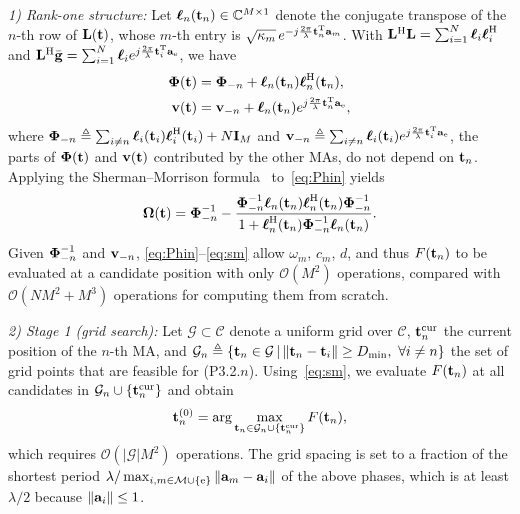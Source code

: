 \documentclass[journal]{IEEEtran}
\begin{document}
\textit{1) Rank-one structure:} Let $\boldsymbol{\ell}_n(\mathbf{t}_n)\in\mathbb C^{M\times1}$ denote the conjugate transpose of the $n$-th row of $\mathbf{L}(\mathbf{t})$, whose $m$-th entry is $\sqrt{\kappa_m}\,e^{-j\frac{2\pi}{\lambda}\mathbf{t}_n^{\mathrm T}\mathbf{a}_m}$. With $\mathbf{L}^{\mathrm H}\mathbf{L}=\sum_{i=1}^N\boldsymbol{\ell}_i\boldsymbol{\ell}_i^{\mathrm H}$ and $\mathbf{L}^{\mathrm H}\bar{\mathbf{g}}=\sum_{i=1}^N\boldsymbol{\ell}_ie^{j\frac{2\pi}{\lambda}\mathbf{t}_i^{\mathrm T}\mathbf{a}_{\mathrm e}}$, we have
\begin{align}
\boldsymbol{\Phi}(\mathbf{t})&=\boldsymbol{\Phi}_{-n}+\boldsymbol{\ell}_n(\mathbf{t}_n)\boldsymbol{\ell}_n^{\mathrm H}(\mathbf{t}_n),\label{eq:Phin}\\
\mathbf{v}(\mathbf{t})&=\mathbf{v}_{-n}+\boldsymbol{\ell}_n(\mathbf{t}_n)e^{j\frac{2\pi}{\lambda}\mathbf{t}_n^{\mathrm T}\mathbf{a}_{\mathrm e}},\label{eq:vn}
\end{align}
where $\boldsymbol{\Phi}_{-n}\triangleq\sum_{i\neq n}\boldsymbol{\ell}_i(\mathbf{t}_i)\boldsymbol{\ell}_i^{\mathrm H}(\mathbf{t}_i)+N\mathbf{I}_M$ and $\mathbf{v}_{-n}\triangleq\sum_{i\neq n}\boldsymbol{\ell}_i(\mathbf{t}_i)e^{j\frac{2\pi}{\lambda}\mathbf{t}_i^{\mathrm T}\mathbf{a}_{\mathrm e}}$, the parts of $\boldsymbol{\Phi}(\mathbf{t})$ and $\mathbf{v}(\mathbf{t})$ contributed by the other MAs, do not depend on $\mathbf{t}_n$. Applying the Sherman--Morrison formula~\cite{Horn2013} to~\eqref{eq:Phin} yields
\begin{equation}\label{eq:sm}
\boldsymbol{\Omega}(\mathbf{t})=\boldsymbol{\Phi}_{-n}^{-1}-\frac{\boldsymbol{\Phi}_{-n}^{-1}\boldsymbol{\ell}_n(\mathbf{t}_n)\boldsymbol{\ell}_n^{\mathrm H}(\mathbf{t}_n)\boldsymbol{\Phi}_{-n}^{-1}}{1+\boldsymbol{\ell}_n^{\mathrm H}(\mathbf{t}_n)\boldsymbol{\Phi}_{-n}^{-1}\boldsymbol{\ell}_n(\mathbf{t}_n)}.
\end{equation}
Given $\boldsymbol{\Phi}_{-n}^{-1}$ and $\mathbf{v}_{-n}$, \eqref{eq:Phin}--\eqref{eq:sm} allow $\omega_m$, $c_m$, $d$, and thus $F(\mathbf{t}_n)$ to be evaluated at a candidate position with only $\mathcal O(M^2)$ operations, compared with $\mathcal O(NM^2+M^3)$ operations for computing them from scratch.

\textit{2) Stage 1 (grid search):} Let $\mathcal G\subset\mathcal C$ denote a uniform grid over $\mathcal C$, $\mathbf{t}_n^{\mathrm{cur}}$ the current position of the $n$-th MA, and $\mathcal G_n\triangleq\{\mathbf{t}_n\in\mathcal G\,|\,\|\mathbf{t}_n-\mathbf{t}_i\|\ge D_{\min},\ \forall i\neq n\}$ the set of grid points that are feasible for (P3.2.$n$). Using~\eqref{eq:sm}, we evaluate $F(\mathbf{t}_n)$ at all candidates in $\mathcal G_n\cup\{\mathbf{t}_n^{\mathrm{cur}}\}$ and obtain
\begin{equation}\label{eq:gridsearch}
\mathbf{t}_n^{(0)}=\arg\max_{\mathbf{t}_n\in\mathcal G_n\cup\{\mathbf{t}_n^{\mathrm{cur}}\}}F(\mathbf{t}_n),
\end{equation}
which requires $\mathcal O(|\mathcal G|M^2)$ operations. The grid spacing is set to a fraction of the shortest period $\lambda/\max_{i,m\in\mathcal M\cup\{\mathrm e\}}\|\mathbf{a}_{m}-\mathbf{a}_i\|$ of the above phases, which is at least $\lambda/2$ because $\|\mathbf{a}_i\|\le1$.
\end{document}
